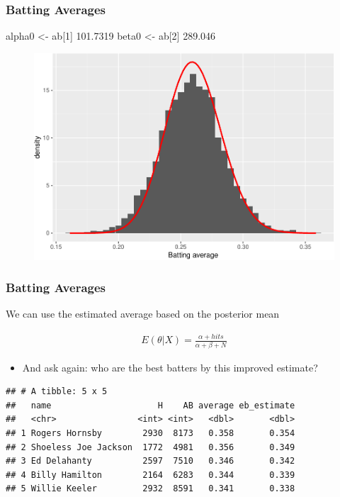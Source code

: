 \documentclass[
  shownotes,
  xcolor={svgnames},
  hyperref={colorlinks,citecolor=DarkBlue,linkcolor=DarkRed,urlcolor=DarkBlue}
  ]{beamer}
\newenvironment{Shaded}{\begin{snugshade}}{\end{snugshade}}
\newcommand{\DecValTok}[1]{\textcolor[rgb]{0.00,0.00,0.81}{#1}}
\newcommand{\NormalTok}[1]{#1}
\newcommand{\StringTok}[1]{\textcolor[rgb]{0.31,0.60,0.02}{#1}}
\begin{document}
\begin{frame}[fragile]
\frametitle{Batting Averages}
\footnotesize
\begin{Shaded}
\begin{Highlighting}[]
\NormalTok{alpha0 \textless{}{-}}\StringTok{ }\NormalTok{ab[}\DecValTok{1}\NormalTok{]}
101.7319 
\NormalTok{beta0 \textless{}{-}}\StringTok{ }\NormalTok{ab[}\DecValTok{2}\NormalTok{]}
289.046 
\end{Highlighting}
\end{Shaded}



\begin{figure}[H] \centering
  \centering
  \includegraphics[scale=0.4]{figures/av_hist_w_mle.pdf}
  \\
  \tiny 
\end{figure}


\end{frame}
\begin{frame}[fragile]
\frametitle{Batting Averages}

We can use the estimated average based on the posterior mean

\begin{align}
E(\theta|X)=\frac{\alpha+hits}{\alpha+\beta+N}
\end{align}


\begin{itemize}
  \item And ask again: who are the best batters by this improved estimate?
\end{itemize}


\begin{footnotesize}
\begin{verbatim}
## # A tibble: 5 x 5
##   name                     H    AB average eb_estimate
##   <chr>                <int> <int>   <dbl>       <dbl>
## 1 Rogers Hornsby        2930  8173   0.358       0.354
## 2 Shoeless Joe Jackson  1772  4981   0.356       0.349
## 3 Ed Delahanty          2597  7510   0.346       0.342
## 4 Billy Hamilton        2164  6283   0.344       0.339
## 5 Willie Keeler         2932  8591   0.341       0.338
\end{verbatim}
\end{footnotesize}

\end{frame}
\end{document}
